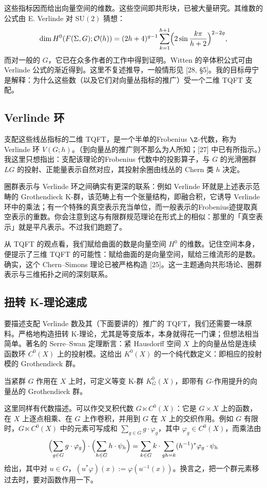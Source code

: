 这些指标因而给出向量空间的维数。这些空间即共形块，已被大量研究。其维数的公式由 E. Verlinde 对 $\mathrm{SU}(2)$ 猜想：
\[
\dim H^0(F(\Sigma,G);\mathcal{O}(h))=(2h+4)^{g-1}\sum_{k=1}^{h+1}\Bigl(2\sin\frac{k\pi}{h+2}\Bigr)^{2-2g},
\]
而对一般的 $G$，它已在众多作者的工作中得到证明。Witten 的辛体积公式可由 Verlinde 公式的渐近得到。这里不复述推导，一般情形见 [28, §5]。我的目标毋宁是解释：为什么这些数（以及它们对向量丛指标的推广）受一个二维 TQFT 支配。

\subsection{Verlinde 环}

支配这些线丛指标的二维 TQFT，是一个半单的Frobenius $\Z$-代数，称为 Verlinde 环 $V(G;h)$。（到向量丛的推广则不那么为人所知；[27] 中已有所指示。）我这里只想指出：支配该理论的Frobenius 代数中的投影算子，与 $G$ 的光滑圈群 $LG$ 的投射、正能量表示自然对应，其投射余圈由线丛的 Chern 类 $h$ 决定。

圈群表示与 Verlinde 环之间确实有更深的联系：例如 Verlinde 环就是上述表示范畴的 Grothendieck K-群，该范畴上有一个张量结构，即融合积，它诱导 Verlinde 环中的乘法；有一个特殊的真空表示充当单位，而一般表示的Frobenius迹提取真空表示的重数。你会注意到这与有限群规范理论在形式上的相似：那里的「真空表示」就是平凡表示。不过我们跑题了。

\begin{remark}
从 TQFT 的观点看，我们赋给曲面的数是向量空间 $H^0$ 的维数。记住空间本身，便提示了三维 TQFT 的可能性：赋给曲面的是向量空间，赋给三维流形的是数。确实，这个 Chern--Simons 理论已被严格构造 [25]。这一主题通向共形场论、圈群表示与三维拓扑之间的深刻联系。
\end{remark}

\subsection{扭转 K-理论速成}

要描述支配 Verlinde 数及其（下面要讲的）推广的 TQFT，我们还需要一味原料。严格地构造扭转 K-理论，尤其是等变版本，本身就得花一门课；但想法相当简单。著名的 Serre--Swan 定理断言：紧 Hausdorff 空间 $X$ 上的向量丛恰是连续函数环 $C^0(X)$ 上的投射模。这给出 $K^0(X)$ 的一个纯代数定义：即相应的投射模的 Grothendieck 群。

当紧群 $G$ 作用在 $X$ 上时，可定义等变 K-群 $K^0_G(X)$，即带有 $G$-作用提升的向量丛的 Grothendieck 群。

这里同样有代数描述。可以作交叉积代数 $G\ltimes C^0(X)$：它是 $G\times X$ 上的函数，在 $X$ 上逐点相乘、在 $G$ 上作卷积，并用到 $G$ 在 $X$ 上的交织作用。例如 $G$ 有限时，$G\ltimes C^0(X)$ 中的元素可写成和 $\sum_{g\in G}g\cdot\varphi_g$，其中 $\varphi_g\in C^0(X)$，而乘法由
\[
\Bigl(\sum_{g\in G}g\cdot\varphi_g\Bigr)\cdot\Bigl(\sum_{h\in G}h\cdot\psi_h\Bigr)
=\sum_{k\in G}k\cdot\sum_{gh=k}(h^{-1})^*\varphi_g\cdot\psi_h
\]
给出，其中对 $u\in G$，$(u^*\varphi)(x):=\varphi(u^{-1}(x))$。换言之，把一个群元素移过去时，要对函数作用一下。

